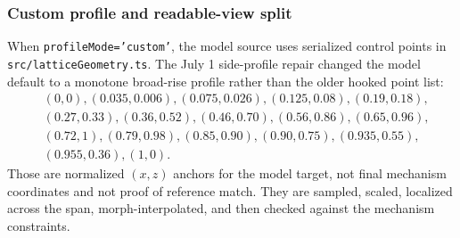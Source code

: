 \documentclass[12pt,letterpaper]{article}
\newcommand{\code}[1]{\texttt{#1}}
\newcommand{\pathcode}[1]{\nolinkurl{#1}}
\begin{document}
\subsubsection{Custom profile and readable-view split}

When \code{profileMode='custom'}, the model source uses serialized control points in \pathcode{src/latticeGeometry.ts}. The July 1 side-profile repair changed the model default to a monotone broad-rise profile rather than the older hooked point list:
\[
\begin{split}
&(0,0),(0.035,0.006),(0.075,0.026),(0.125,0.08),(0.19,0.18),\\
&(0.27,0.33),(0.36,0.52),(0.46,0.70),(0.56,0.86),(0.65,0.96),\\
&(0.72,1),(0.79,0.98),(0.85,0.90),(0.90,0.75),(0.935,0.55),\\
&(0.955,0.36),(1,0).
\end{split}
\]
Those are normalized \((x,z)\) anchors for the model target, not final mechanism coordinates and not proof of reference match. They are sampled, scaled, localized across the span, morph-interpolated, and then checked against the mechanism constraints.
\end{document}
